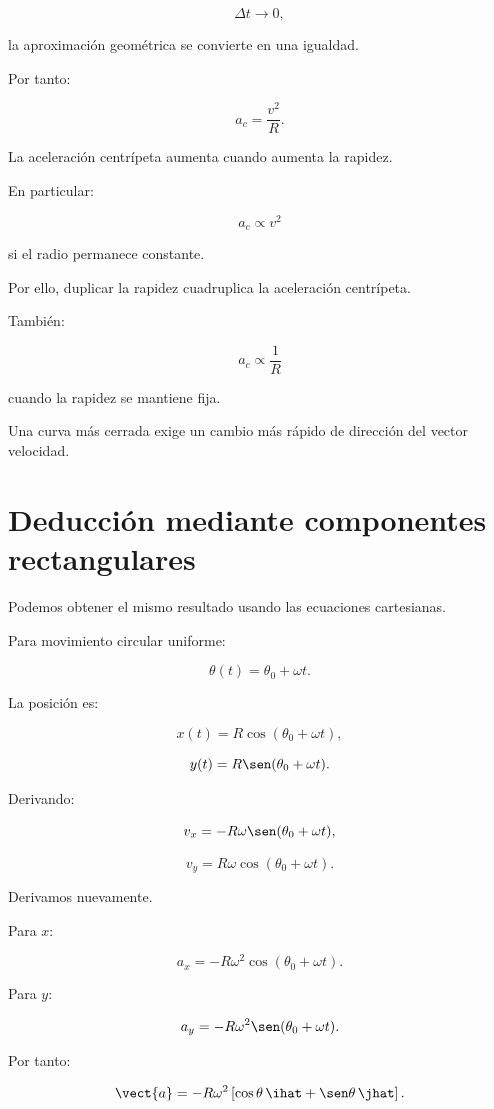 \[
\Delta t\to0,
\]

la aproximación geométrica se convierte en una igualdad.

Por tanto:

\[
\boxed{
a_c=\frac{v^2}{R}
}.
\]

\begin{interpretacion}

La aceleración centrípeta aumenta cuando aumenta la rapidez.

En particular:

\[
a_c\propto v^2
\]

si el radio permanece constante.

Por ello, duplicar la rapidez cuadruplica la aceleración centrípeta.

También:

\[
a_c\propto\frac{1}{R}
\]

cuando la rapidez se mantiene fija.

Una curva más cerrada exige un cambio más rápido de dirección del vector
velocidad.

\end{interpretacion}


\section{Deducción mediante componentes rectangulares}

Podemos obtener el mismo resultado usando las ecuaciones cartesianas.

Para movimiento circular uniforme:

\[
\theta(t)=\theta_0+\omega t.
\]

La posición es:

\[
x(t)=R\cos(\theta_0+\omega t),
\]

\[
y(t)=R\sen(\theta_0+\omega t).
\]

Derivando:

\[
v_x=-R\omega\sen(\theta_0+\omega t),
\]

\[
v_y=R\omega\cos(\theta_0+\omega t).
\]

Derivamos nuevamente.

Para \(x\):

\[
a_x
=
-R\omega^2\cos(\theta_0+\omega t).
\]

Para \(y\):

\[
a_y
=
-R\omega^2\sen(\theta_0+\omega t).
\]

Por tanto:

\[
\vect{a}
=
-R\omega^2
\left[
\cos\theta\,\ihat+\sen\theta\,\jhat
\right].
\]

